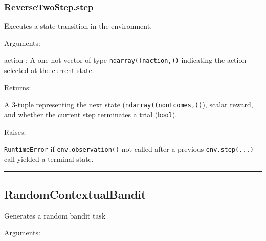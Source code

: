 \hypertarget{reversetwostep.step}{%
\subsubsection{ReverseTwoStep.step}\label{reversetwostep.step}}

\begin{Shaded}
\begin{Highlighting}[]
\end{Highlighting}
\end{Shaded}

Executes a state transition in the environment.

Arguments:

action : A one-hot vector of type \texttt{ndarray((naction,))}
indicating the action selected at the current state.

Returns:

A 3-tuple representing the next state (\texttt{ndarray((noutcomes,))}),
scalar reward, and whether the current step terminates a trial
(\texttt{bool}).

Raises:

\texttt{RuntimeError} if \texttt{env.observation()} not called after a
previous \texttt{env.step(...)} call yielded a terminal state.

\begin{center}\rule{0.5\linewidth}{\linethickness}\end{center}

\hypertarget{randomcontextualbandit}{%
\subsection{RandomContextualBandit}\label{randomcontextualbandit}}

\begin{Shaded}
\begin{Highlighting}[]
\end{Highlighting}
\end{Shaded}

Generates a random bandit task

Arguments:

